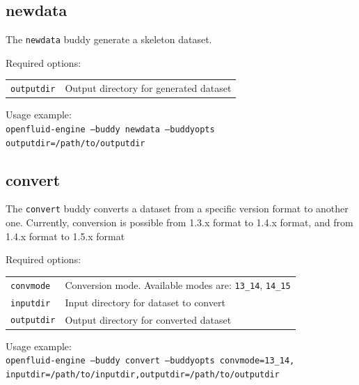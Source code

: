 \subsection{newdata}

The \texttt{newdata} buddy generate a skeleton dataset. 

\bigskip

\noindent Required options:
\begin{center}
\begin{tabularx}{\linewidth}{lX}
\texttt{outputdir}&Output directory for generated dataset\\
\end{tabularx}
\end{center}

\bigskip

\noindent Usage example:\\
\texttt{openfluid-engine --buddy newdata --buddyopts
outputdir=/path/to/outputdir}

\subsection{convert}

The \texttt{convert} buddy converts a dataset from a specific version format to another one.
Currently, conversion is possible from 1.3.x format to 1.4.x format, and from 1.4.x format to 1.5.x format 

\bigskip

\noindent Required options:
\begin{center}
\begin{tabularx}{\linewidth}{lX} 
\texttt{convmode}&Conversion mode. Available modes are: \texttt{13\_14}, \texttt{14\_15}\\
\texttt{inputdir}&Input directory for dataset to convert\\ 
\texttt{outputdir}&Output directory for converted dataset\\
\end{tabularx}
\end{center}

\bigskip

\noindent Usage example:\\
\texttt{openfluid-engine --buddy convert --buddyopts convmode=13\_14,
inputdir=/path/to/inputdir,outputdir=/path/to/outputdir}


